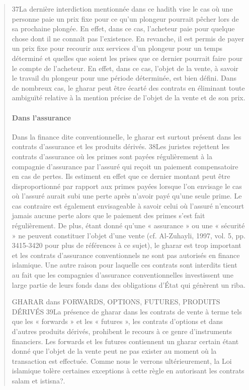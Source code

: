 \begin{quote}
37La dernière interdiction mentionnée dans ce hadith vise le cas où une personne paie un prix fixe pour ce qu’un plongeur pourrait pêcher lors de sa prochaine plongée. En effet, dans ce cas, l’acheteur paie pour quelque chose dont il ne connaît pas l’existence. En revanche, il est permis de payer un prix fixe pour recourir aux services d’un plongeur pour un temps déterminé et quelles que soient les prises que ce dernier pourrait faire pour le compte de l’acheteur. En effet, dans ce cas, l’objet de la vente, à savoir le travail du plongeur pour une période déterminée, est bien défini. Dans de nombreux cas, le gharar peut être écarté des contrats en éliminant toute ambiguïté relative à la mention précise de l’objet de la vente et de son prix.

\paragraph{Dans l'assurance}
Dans la finance dite conventionnelle, le gharar est surtout présent dans les contrats d’assurance et les produits dérivés.
38Les juristes rejettent les contrats d’assurance où les primes sont payées régulièrement à la compagnie d’assurance par l’assuré qui reçoit un paiement compensatoire en cas de pertes. Ils estiment en effet que ce dernier montant peut être disproportionné par rapport aux primes payées lorsque l’on envisage le cas où l’assuré aurait subi une perte après n’avoir payé qu’une seule prime. Le cas contraire est également envisageable à savoir celui où l’assuré n’encourt jamais aucune perte alors que le paiement des primes s’est fait régulièrement. De plus, étant donné qu’une « assurance » ou une « sécurité » ne peuvent constituer l’objet d’une vente (cf. Al-Zuhayli, 1997, vol. 5, pp. 3415-3420 pour plus de références à ce sujet), le gharar est trop important et les contrats d’assurance conventionnels ne sont pas autorisés en finance islamique. Une autre raison pour laquelle ces contrats sont interdits tient au fait que les compagnies d’assurance conventionnelles investissent une large partie de leurs fonds dans des obligations d’État qui génèrent un riba.

GHARAR dans FORWARDS, OPTIONS, FUTURES, PRODUITS DÉRIVÉS
39La présence de gharar dans les contrats de vente à terme tels que les « forwards » et les « futures », les contrats d’options et dans d’autres produits dérivés, prohibent le recours à ce genre d’instruments financiers. Les forwards et les futures contiennent un gharar certain étant donné que l’objet de la vente peut ne pas exister au moment où la transaction est effectuée. Comme nous le verrons ultérieurement, la Loi islamique tolère certaines exceptions à cette règle en autorisant les contrats salam et istisna?.


\end{quote}
